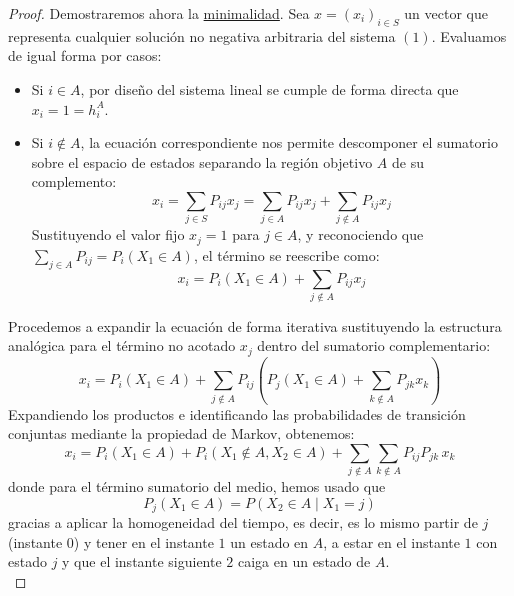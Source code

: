 \begin{teo}
\begin{proof}
    \noindent
    Demostraremos ahora la \underline{minimalidad}. Sea $x = (x_i)_{i \in S}$ un vector que representa cualquier solución no negativa arbitraria del sistema $(1)$. Evaluamos de igual forma por casos:
    \begin{itemize}
        \item Si $i \in A$, por diseño del sistema lineal se cumple de forma directa que $x_i = 1 = h_i^A$.
        \item Si $i \notin A$, la ecuación correspondiente nos permite descomponer el sumatorio sobre el espacio de estados separando la región objetivo $A$ de su complemento:
        \[
        x_i = \sum_{j \in S} P_{ij} x_j = \sum_{j \in A} P_{ij} x_j + \sum_{j \notin A} P_{ij} x_j
        \]
        Sustituyendo el valor fijo $x_j = 1$ para $j \in A$, y reconociendo que $\sum\limits_{j \in A} P_{ij} = P_i(X_1 \in A)$, el término se reescribe como:
        \[
        x_i = P_i(X_1 \in A) + \sum_{j \notin A} P_{ij} x_j
        \]
    \end{itemize}
    Procedemos a expandir la ecuación de forma iterativa sustituyendo la estructura analógica para el término no acotado $x_j$ dentro del sumatorio complementario:
    \[
    x_i = P_i(X_1 \in A) + \sum_{j \notin A} P_{ij} \left( P_j(X_1 \in A) + \sum_{k \notin A} P_{jk} x_k \right)
    \]
    Expandiendo los productos e identificando las probabilidades de transición conjuntas mediante la propiedad de Markov, obtenemos:
    \[
    x_i = P_i(X_1 \in A) + P_i(X_1 \notin A, X_2 \in A) + \sum_{j \notin A} \sum_{k \notin A} P_{ij} P_{jk} \, x_k
    \]
    donde para el término sumatorio del medio, hemos usado que 
    $$ P_j(X_1 \in A) = P(X_2 \in A \mid X_1 = j) $$
    gracias a aplicar la homogeneidad del tiempo, es decir, es lo mismo partir de $j$ (instante $0$) y tener en el instante $1$ un estado en $A$, a estar en el instante $1$ con estado $j$ y que el instante siguiente $2$ caiga en un estado de $A$. \\


\end{proof}
\end{teo}

